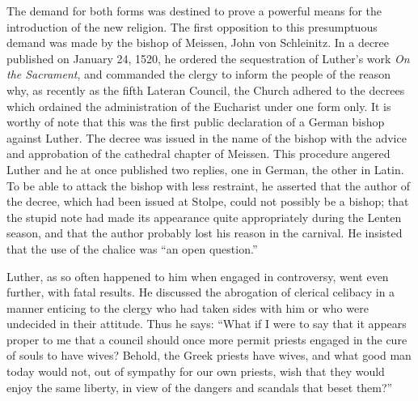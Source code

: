 The demand for both forms was destined to prove a powerful
means for the introduction of the new religion.
The first opposition to this presumptuous demand was made by
the bishop of Meissen, John von Schleinitz. In a decree published on
January 24, 1520, he ordered the sequestration of Luther’s work
\textit{On the Sacrament}, and commanded the clergy to inform the people
of the reason why, as recently as the fifth Lateran Council, the
Church adhered to the decrees which ordained the administration of
the Eucharist under one form only. It is worthy of note that this
was the first public declaration of a German bishop against Luther.
The decree was issued in the name of the bishop with the advice
and approbation of the cathedral chapter of Meissen. This procedure
angered Luther and he at once published two replies, one in German, the
other in Latin. To be able to attack the bishop with less
restraint, he asserted that the author of the decree, which had been
issued at Stolpe, could not possibly be a bishop; that the stupid note
had made its appearance quite appropriately during the Lenten
season, and that the author probably lost his reason in the carnival.
He insisted that the use of the chalice was “an open question.”

Luther, as so often happened to him when engaged in controversy,
went even further, with fatal results. He discussed the abrogation of
clerical celibacy in a manner enticing to the clergy who had taken
sides with him or who were undecided in their attitude. Thus he
says: “What if I were to say that it appears proper to me that a
council should once more permit priests engaged in the cure of souls
to have wives? Behold, the Greek priests have wives, and what good
man today would not, out of sympathy for our own priests, wish
that they would enjoy the same liberty, in view of the dangers and
scandals that beset them?”

